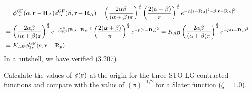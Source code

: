 \documentclass[a4paper]{book}
\newcounter{exercise}[chapter]
\newcounter{solution}[chapter]
\newcommand{\bfr}{{\bf r}}
\newcommand{\bfR}{{\bf R}}
\begin{document}
\begin{solution}
\begin{align*}
		&\hspace{1.4em}\phi^{\rm GF}_{1s} ( \alpha , \bfr - \bfR_A ) \phi^{\rm GF}_{1s} ( \beta , \bfr - \bfR_B ) = \left( \frac{ 2 \alpha \beta }{ ( \alpha + \beta )\pi} \right)^{ \frac{3}{4} } \left( \frac{ 2 ( \alpha + \beta ) }{\pi} \right)^{ \frac{3}{4} } e^{-\alpha | \bfr - \bfR_A |^2 - \beta | \bfr - \bfR_B |^2 } \\
		&= \left( \frac{ 2 \alpha \beta }{ ( \alpha + \beta )\pi} \right)^{ \frac{3}{4} } e^{ - \frac{ \alpha \beta }{ \alpha + \beta } | \bfR_A - \bfR_B |^2 } \left( \frac{ 2 ( \alpha + \beta ) }{\pi} \right)^{ \frac{3}{4} } e^{ - p ( \bfr - \bfR_p )^2 } = K_{AB} \left( \frac{ 2 \alpha \beta }{ ( \alpha + \beta )\pi} \right)^{ \frac{3}{4} } e^{ - p ( \bfr - \bfR_p )^2 } \\
		&= K_{AB} \phi^{\rm GF}_{1s} ( p , \bfr - \bfR_p ) .
	\end{align*}
	In a nutshell, we have verified (3.207).
		
	\end{solution}
	
	\begin{exercise}
	Calculate the values of $\phi(\bfr)$ at the origin for the three STO-LG contracted functions and compare with the value of $(\pi)^{-1/2}$ for a Slater function ($\zeta= 1.0$).
	\end{exercise}
	
\end{document}
